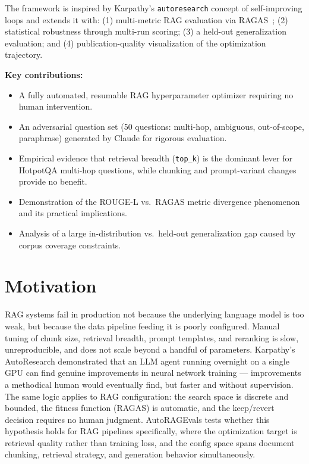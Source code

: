 \documentclass[11pt,a4paper]{article}
\begin{document}
The framework is inspired by Karpathy's \texttt{autoresearch} concept of
self-improving loops and extends it with: (1) multi-metric RAG evaluation via
RAGAS~\cite{es2023ragas}; (2) statistical robustness through multi-run scoring;
(3) a held-out generalization evaluation; and (4) publication-quality
visualization of the optimization trajectory.

\textbf{Key contributions:}
\begin{itemize}[leftmargin=2em]
  \item A fully automated, resumable RAG hyperparameter optimizer requiring no
    human intervention.
  \item An adversarial question set (50 questions: multi-hop, ambiguous,
    out-of-scope, paraphrase) generated by Claude for rigorous evaluation.
  \item Empirical evidence that retrieval breadth (\texttt{top\_k}) is the
    dominant lever for HotpotQA multi-hop questions, while chunking and
    prompt-variant changes provide no benefit.
  \item Demonstration of the ROUGE-L vs.\ RAGAS metric divergence phenomenon
    and its practical implications.
  \item Analysis of a large in-distribution vs.\ held-out generalization gap
    caused by corpus coverage constraints.
\end{itemize}

\section{Motivation}

RAG systems fail in production not because the underlying language model is too
weak, but because the data pipeline feeding it is poorly configured. Manual
tuning of chunk size, retrieval breadth, prompt templates, and reranking is
slow, unreproducible, and does not scale beyond a handful of parameters.
Karpathy's AutoResearch demonstrated that an LLM agent running overnight on a
single GPU can find genuine improvements in neural network training ---
improvements a methodical human would eventually find, but faster and without
supervision. The same logic applies to RAG configuration: the search space is
discrete and bounded, the fitness function (RAGAS) is automatic, and the
keep/revert decision requires no human judgment. AutoRAGEvals tests whether this
hypothesis holds for RAG pipelines specifically, where the optimization target
is retrieval quality rather than training loss, and the config space spans
document chunking, retrieval strategy, and generation behavior simultaneously.
\end{document}
